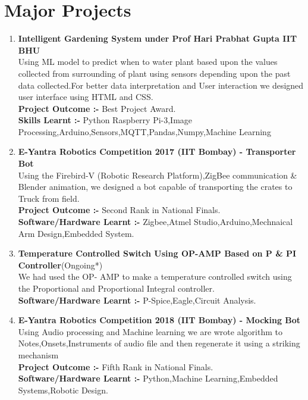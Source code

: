 \documentclass[12pt]{article}
\begin{document}
\section*{\textbf{Major Projects}}
\begin{enumerate}
\item {\textbf{Intelligent Gardening System under Prof Hari Prabhat Gupta IIT BHU }}\\ 
Using ML model to predict when to water plant based upon the values collected from surrounding of plant using sensors depending upon the past data collected.For better data interpretation and User interaction we designed user interface using HTML and CSS.\\
\textbf{Project Outcome :-} Best Project Award.\\
\textbf{Skills Learnt :-} Python Raspberry Pi-3,Image Processing,Arduino,Sensors,MQTT,Pandas,Numpy,Machine Learning 
\item {\textbf{E-Yantra Robotics Competition 2017 (IIT Bombay) - Transporter Bot}}\\ Using the Firebird-V (Robotic Research Platform),ZigBee communication \& Blender animation, we designed  a bot capable of transporting the crates to Truck from field.\\ 
\textbf{Project Outcome :-} Second Rank in National Finals.\\
\textbf{Software/Hardware Learnt :-} Zigbee,Atmel Studio,Arduino,Mechnaical Arm Design,Embedded System.
\item {\textbf{Temperature Controlled Switch Using OP-AMP Based on P \& PI Controller}(Ongoing*)}\\ 
We had used the OP- AMP to make a temperature controlled switch using the Proportional and Proportional Integral controller. 
\\ 
\textbf{Software/Hardware Learnt :-} P-Spice,Eagle,Circuit Analysis.
\item {{\textbf{E-Yantra Robotics Competition 2018 (IIT Bombay) - Mocking Bot}}}\\ 
 Using Audio processing and Machine learning we are wrote algorithm to Notes,Onsets,Instruments of audio file and then regenerate it using a striking mechanism
\\
\textbf{Project Outcome :-} Fifth Rank in National Finals.\\
\textbf{Software/Hardware Learnt :-} Python,Machine Learning,Embedded Systems,Robotic Design.
\end{enumerate}
\end{document}
